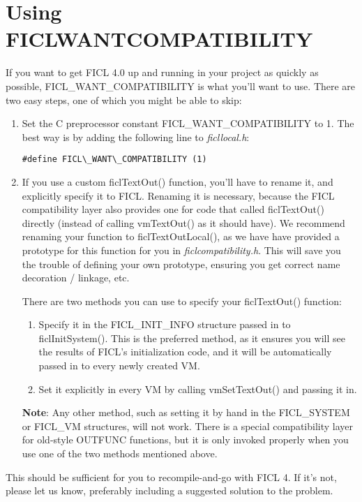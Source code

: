 \section{Using FICL\textunderscore WANT\textunderscore COMPATIBILITY}
If you want to get FICL 4.0 up and running in your project as quickly
as possible, FICL\_WANT\_COMPATIBILITY is what you'll want to use.
There are two easy steps, one of which you might be able to skip:
\begin{enumerate}[noitemsep]
	\item Set the C preprocessor constant FICL\_WANT\_COMPATIBILITY
	to 1. The best way is by adding the following line to
	\textit{ficllocal.h}:
\begin{lstlisting}[frame=single]
#define FICL\_WANT\_COMPATIBILITY (1)
\end{lstlisting}

	\item If you use a custom ficlTextOut() function, you'll have to
	rename it, and explicitly specify it to FICL. Renaming it is
	necessary, because the FICL compatibility layer also provides
	one for code that called ficlTextOut() directly (instead of
	calling vmTextOut() as it should have). We recommend renaming
	your function to ficlTextOutLocal(), as we have have provided a
	prototype for this function for you in
	\textit{ficlcompatibility.h}. This will save you the trouble of
	defining your own prototype, ensuring you get correct name
	decoration / linkage, etc.

	There are two methods you can use to specify your ficlTextOut() function:
	\begin{enumerate}[noitemsep]
		\item Specify it in the FICL\_INIT\_INFO structure
		passed in to ficlInitSystem(). This is the preferred
		method, as it ensures you will see the results of FICL's
		initialization code, and it will be automatically passed
		in to every newly created VM.

		\item Set it explicitly in every VM by calling
		vmSetTextOut() and passing it in.
	\end{enumerate}
	\textbf{Note}: Any other method, such as setting it by hand in
	the FICL\_SYSTEM or FICL\_VM structures, will not work. There
	is a special compatibility layer for old-style OUTFUNC
	functions, but it is only invoked properly when you use one of
	the two methods mentioned above.
\end{enumerate}
This should be sufficient for you to recompile-and-go with FICL 4. If
it's not, please let us know, preferably including a suggested solution
to the problem.


